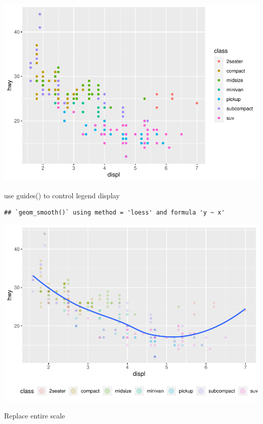 \documentclass[
]{article}
\begin{document}
\includegraphics{rmarkdown_tutorial_files/figure-latex/unnamed-chunk-22-4.pdf}

use guides() to control legend display

\begin{verbatim}
## `geom_smooth()` using method = 'loess' and formula 'y ~ x'
\end{verbatim}

\includegraphics{rmarkdown_tutorial_files/figure-latex/unnamed-chunk-23-1.pdf}

Replace entire scale
\end{document}
